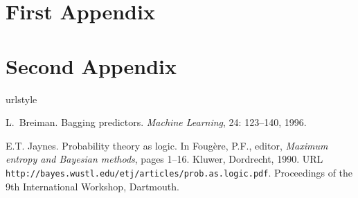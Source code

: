 \documentclass[12pt]{report}
\begin{document}
\appendices  %


\chapter{First Appendix}\label{app:first}

\chapter{Second Appendix}

%

\begin{thebibliography}{8}
\providecommand{\natexlab}[1]{#1}
\providecommand{\url}[1]{\texttt{#1}}
\expandafter\ifx\csname urlstyle\endcsname\relax
  \providecommand{\doi}[1]{doi: #1}\else
  \providecommand{\doi}{doi: \begingroup \urlstyle{rm}\Url}\fi

L.~Breiman.
\newblock Bagging predictors.
\newblock \emph{Machine Learning}, 24: 123--140, 1996.

E.T. Jaynes.
\newblock Probability theory as logic.
\newblock In {Foug\`ere, P.F.}, editor, \emph{Maximum entropy and {B}ayesian
  methods}, pages 1--16. Kluwer, Dordrecht, 1990.
\newblock URL \url{http://bayes.wustl.edu/etj/articles/prob.as.logic.pdf}.
\newblock Proceedings of the 9th International Workshop, Dartmouth.

\end{thebibliography}

\typeout{***}
\typeout{***}
\end{document}

